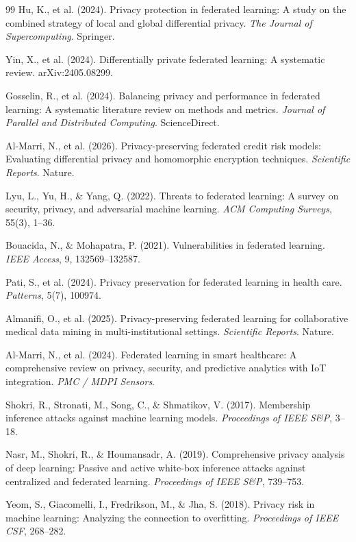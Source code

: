 \documentclass[12pt, a4paper]{report}
\begin{document}
\begin{thebibliography}{99}
Hu, K., et al. (2024).
Privacy protection in federated learning: A study on the combined strategy
of local and global differential privacy.
\textit{The Journal of Supercomputing}. Springer.

Yin, X., et al. (2024).
Differentially private federated learning: A systematic review.
arXiv:2405.08299.

Gosselin, R., et al. (2024).
Balancing privacy and performance in federated learning: A systematic
literature review on methods and metrics.
\textit{Journal of Parallel and Distributed Computing}. ScienceDirect.

Al-Marri, N., et al. (2026).
Privacy-preserving federated credit risk models: Evaluating differential
privacy and homomorphic encryption techniques.
\textit{Scientific Reports}. Nature.

Lyu, L., Yu, H., \& Yang, Q. (2022).
Threats to federated learning: A survey on security, privacy, and adversarial
machine learning.
\textit{ACM Computing Surveys}, 55(3), 1--36.

Bouacida, N., \& Mohapatra, P. (2021).
Vulnerabilities in federated learning.
\textit{IEEE Access}, 9, 132569--132587.

Pati, S., et al. (2024).
Privacy preservation for federated learning in health care.
\textit{Patterns}, 5(7), 100974.

Almanifi, O., et al. (2025).
Privacy-preserving federated learning for collaborative medical data mining
in multi-institutional settings.
\textit{Scientific Reports}. Nature.

Al-Marri, N., et al. (2024).
Federated learning in smart healthcare: A comprehensive review on privacy,
security, and predictive analytics with IoT integration.
\textit{PMC / MDPI Sensors}.

Shokri, R., Stronati, M., Song, C., \& Shmatikov, V. (2017).
Membership inference attacks against machine learning models.
\textit{Proceedings of IEEE S\&P}, 3--18.

Nasr, M., Shokri, R., \& Houmansadr, A. (2019).
Comprehensive privacy analysis of deep learning: Passive and active white-box
inference attacks against centralized and federated learning.
\textit{Proceedings of IEEE S\&P}, 739--753.

Yeom, S., Giacomelli, I., Fredrikson, M., \& Jha, S. (2018).
Privacy risk in machine learning: Analyzing the connection to overfitting.
\textit{Proceedings of IEEE CSF}, 268--282.

\end{thebibliography}
\end{document}
